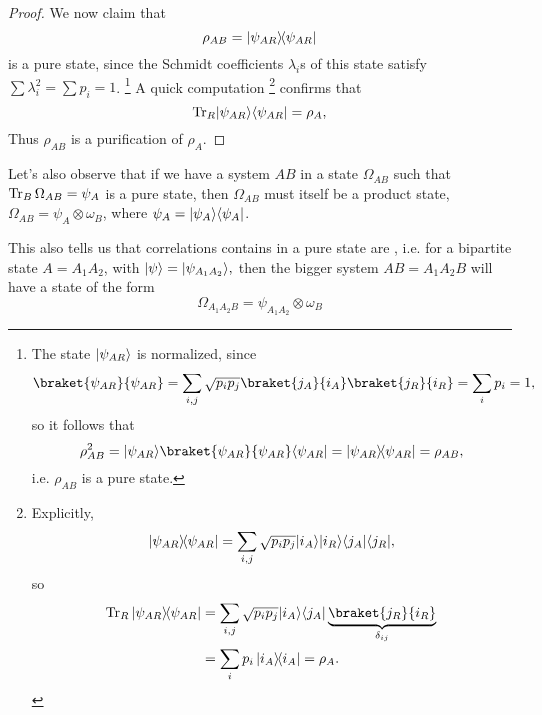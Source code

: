 \begin{proof}
    We now claim that
    \begin{equation}
        \rho_{AB}=\left\lvert{\psi_{AR}}\middle\rangle\!\middle\langle{\psi_{AR}}\right\rvert
    \end{equation}
    is a pure state, since the Schmidt coefficients $\lambda_i$s of this state satisfy $\sum \lambda_i^2 =\sum p_i =1$.%
        \footnote{
            The state $\lvert\psi_{AR}\rangle$ is normalized, since
            \begin{equation*}
                \braket{\psi_{AR}}{\psi_{AR}}=\sum_{i,j}\sqrt{p_i p_j} \braket{j_A}{i_A}\braket{j_R}{i_R} =\sum_i p_i =1,
            \end{equation*}
            so it follows that
            \begin{equation*}
                \rho_{AB}^2= \ket{\psi_{AR}}\braket{\psi_{AR}}{\psi_{AR}}\bra{\psi_{AR}}=\dyad{\psi_{AR}}=\rho_{AB},
            \end{equation*}
            i.e. $\rho_{AB}$ is a pure state.
        }
    A quick computation%
        \footnote{Explicitly,
        \begin{equation*}
            \left\lvert{\psi_{AR}}\middle\rangle\!\middle\langle{\psi_{AR}}\right\rvert=\sum_{i,j} \sqrt{p_i p_j} \lvert i_A\rangle \lvert i_R\rangle \langle j_A\rvert\langle j_R\rvert,
        \end{equation*}
        so
        \begin{align*}
            \Tr_R \dyad{\psi_{AR}} &= \sum_{i,j} \sqrt{p_i p_j} \ket{i_A} \bra{j_A} \underbrace{\braket{j_R}{i_R}}_{\delta_{ij}}\\
                &=\sum_i p_i \dyad{i_A} = \rho_A.
        \end{align*}
        }
    confirms that
    \begin{equation}
        \operatorname{Tr}_R \lvert\psi_{AR}\rangle\langle\psi_{AR}\rvert= \rho_A,
    \end{equation}
    Thus $\rho_{AB}$ is a purification of $\rho_A$.
\end{proof}

Let's also observe that if we have a system $AB$ in a state $\Omega_{AB}$ such that $\operatorname{Tr}_B \Omega_{AB}=\psi_A$ is a pure state, then $\Omega_{AB}$ must itself be a product state, $\Omega_{AB}=\psi_A \otimes \omega_B$, where $\psi_A=\lvert\psi_A\rangle\langle\psi_A\rvert$.

This also tells us that correlations contains in a pure state are , i.e. for a bipartite state $A=A_1 A_2$, with $\lvert\psi\rangle=\lvert\psi_{A_1A_2}\rangle,$ then the bigger system $AB=A_1 A_2 B$ will have a state of the form
\begin{equation}
    \Omega_{A_1A_2B} = \psi_{A_1A_2} \otimes \omega_B
\end{equation}
